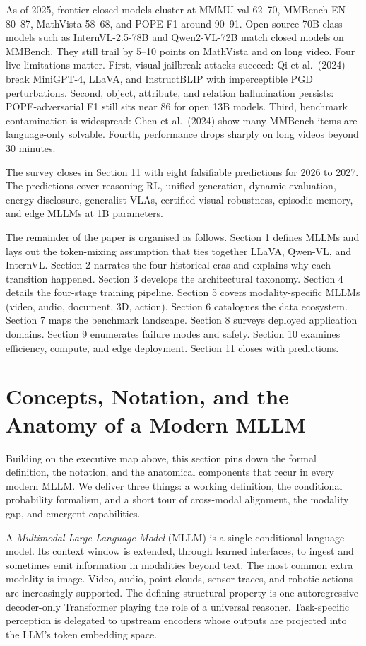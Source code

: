 \documentclass{article}
\begin{document}
As of 2025, frontier closed models cluster at MMMU-val 62--70, MMBench-EN 80--87, MathVista 58--68, and POPE-F1 around 90--91. Open-source 70B-class models such as InternVL-2.5-78B and Qwen2-VL-72B match closed models on MMBench. They still trail by 5--10 points on MathVista and on long video. Four live limitations matter. First, visual jailbreak attacks succeed: Qi et al.~(2024) break MiniGPT-4, LLaVA, and InstructBLIP with imperceptible PGD perturbations. Second, object, attribute, and relation hallucination persists: POPE-adversarial F1 still sits near 86 for open 13B models. Third, benchmark contamination is widespread: Chen et al.~(2024) show many MMBench items are language-only solvable. Fourth, performance drops sharply on long videos beyond 30 minutes.

The survey closes in Section 11 with eight falsifiable predictions for 2026 to 2027. The predictions cover reasoning RL, unified generation, dynamic evaluation, energy disclosure, generalist VLAs, certified visual robustness, episodic memory, and edge MLLMs at 1B parameters.

The remainder of the paper is organised as follows. Section 1 defines MLLMs and lays out the token-mixing assumption that ties together LLaVA, Qwen-VL, and InternVL. Section 2 narrates the four historical eras and explains why each transition happened. Section 3 develops the architectural taxonomy. Section 4 details the four-stage training pipeline. Section 5 covers modality-specific MLLMs (video, audio, document, 3D, action). Section 6 catalogues the data ecosystem. Section 7 maps the benchmark landscape. Section 8 surveys deployed application domains. Section 9 enumerates failure modes and safety. Section 10 examines efficiency, compute, and edge deployment. Section 11 closes with predictions.

\section{Concepts, Notation, and the Anatomy of a Modern MLLM}\label{concepts-notation-and-the-anatomy-of-a-modern-mllm}

Building on the executive map above, this section pins down the formal definition, the notation, and the anatomical components that recur in every modern MLLM. We deliver three things: a working definition, the conditional probability formalism, and a short tour of cross-modal alignment, the modality gap, and emergent capabilities.

A \emph{Multimodal Large Language Model} (MLLM) is a single conditional language model. Its context window is extended, through learned interfaces, to ingest and sometimes emit information in modalities beyond text. The most common extra modality is image. Video, audio, point clouds, sensor traces, and robotic actions are increasingly supported. The defining structural property is one autoregressive decoder-only Transformer playing the role of a universal reasoner. Task-specific perception is delegated to upstream encoders whose outputs are projected into the LLM's token embedding space.
\end{document}
